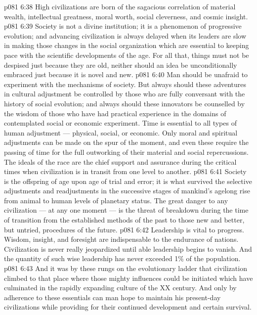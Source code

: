 \vs p081 6:38 High civilizations are born of the sagacious correlation of material wealth, intellectual greatness, moral worth, social cleverness, and cosmic insight.
\vs p081 6:39 \bibnobreakspace {} Society is not a divine institution; it is a phenomenon of progressive evolution; and advancing civilization is always delayed when its leaders are slow in making those changes in the social organization which are essential to keeping pace with the scientific developments of the age. For all that, things must not be despised just because they are old, neither should an idea be unconditionally embraced just because it is novel and new.
\vs p081 6:40 Man should be unafraid to experiment with the mechanisms of society. But always should these adventures in cultural adjustment be controlled by those who are fully conversant with the history of social evolution; and always should these innovators be counselled by the wisdom of those who have had practical experience in the domains of contemplated social or economic experiment.  Time is essential to all types of human adjustment --- physical, social, or economic. Only moral and spiritual adjustments can be made on the spur of the moment, and even these require the passing of time for the full outworking of their material and social repercussions. The ideals of the race are the chief support and assurance during the critical times when civilization is in transit from one level to another.
\vs p081 6:41 \bibnobreakspace {} Society is the offspring of age upon age of trial and error; it is what survived the selective adjustments and readjustments in the successive stages of mankind’s agelong rise from animal to human levels of planetary status. The great danger to any civilization --- at any one moment --- is the threat of breakdown during the time of transition from the established methods of the past to those new and better, but untried, procedures of the future.
\vs p081 6:42 Leadership is vital to progress. Wisdom, insight, and foresight are indispensable to the endurance of nations. Civilization is never really jeopardized until able leadership begins to vanish. And the quantity of such wise leadership has never exceeded 1\% of the population.
\vs p081 6:43 And it was by these rungs on the evolutionary ladder that civilization climbed to that place where those mighty influences could be initiated which have culminated in the rapidly expanding culture of the XX century. And only by adherence to these essentials can man hope to maintain his present\hyp{}day civilizations while providing for their continued development and certain survival.
